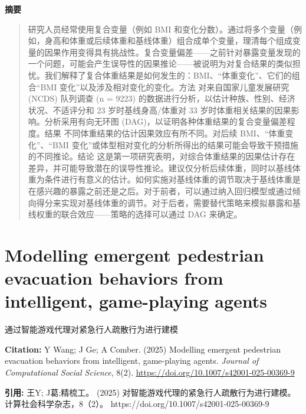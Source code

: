 \noindent\textbf{摘要}\par
\begin{quote}\small
研究人员经常使用复合变量（例如 BMI 和变化分数）。通过将多个变量（例如，身高和体重或后续体重和基线体重）组合成单个变量，理清每个组成变量的因果作用变得具有挑战性。复合变量偏差——之前针对暴露变量发现的一个问题，可能会产生误导性的因果推论——被说明为对复合结果的类似担忧。我们解释了复合体重结果是如何发生的：BMI、“体重变化”、它们的组合“BMI 变化”以及涉及相对变化的变化。方法 对来自国家儿童发展研究 (NCDS) 队列调查 (n = 9223) 的数据进行分析，以估计种族、性别、经济状况、不适评分和 23 岁时基线身高/体重对 33 岁时体重相关结果的因果影响。分析采用有向无环图 (DAG)，以证明各种体重结果的复合变量偏差程度。结果 不同体重结果的估计因果效应有所不同。对后续 BMI、“体重变化”、“BMI 变化”或体型相对变化的分析所得出的结果可能会导致干预措施的不同推论。结论 这是第一项研究表明，对综合体重结果的因果估计存在差异，并可能导致潜在的误导性推论。建议仅分析后续体重，同时以基线体重为条件进行有意义的估计。如何实施对基线体重的调节取决于基线体重是在感兴趣的暴露之前还是之后。对于前者，可以通过纳入回归模型或通过倾向得分来实现对基线体重的调节。对于后者，需要替代策略来模拟暴露和基线权重的联合效应——策略的选择可以通过 DAG 来确定。
\end{quote}

\vspace{0.5em}


\chapter{Modelling emergent pedestrian evacuation behaviors from intelligent, game-playing agents}
\begin{center}\small 通过智能游戏代理对紧急行人疏散行为进行建模\end{center}

\noindent\textbf{Citation:} Y Wang; J Ge; A Comber. (2025) Modelling emergent pedestrian evacuation behaviors from intelligent, game-playing agents. \textit{Journal of Computational Social Science}, 8(2). \url{https://doi.org/10.1007/s42001-025-00369-9}

\vspace{0.5em}
\noindent\textbf{引用:} 王Y; J葛;精梳工。 (2025) 对智能游戏代理的紧急行人疏散行为进行建模。计算社会科学杂志，8（2）。 https://doi.org/10.1007/s42001-025-00369-9

